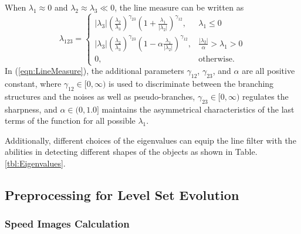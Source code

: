 When $\lambda_1 \approx 0$ and $\lambda_2 \approx \lambda_3 \ll 0$, the line measure can be written as
\begin{equation}
\label{eqn:LineMeasure}
\lambda_{123} =
\begin{cases}
\left| \lambda_3 \right| \left( \frac{\lambda_2}{\lambda_3} \right)^{\gamma_{23}} \left( 1 + \frac{\lambda_1}{\left| \lambda_2 \right|} \right)^{\gamma_{12}}, & \lambda_1 \le 0 \\
\left| \lambda_3 \right| \left( \frac{\lambda_2}{\lambda_3} \right)^{\gamma_{23}} \left( 1 - \alpha \frac{\lambda_1}{\left| \lambda_2 \right|} \right)^{\gamma_{12}}, & \frac{\left| \lambda_2 \right|}{\alpha} > \lambda_1 > 0 \\
0, & \text{otherwise}.
\end{cases}
\end{equation}
In (\ref{eqn:LineMeasure}), the additional parameters $\gamma_{12}$, $\gamma_{23}$, and $\alpha$ are all positive constant, where $\gamma_{12} \in [0, \infty)$ is used to discriminate between the branching structures and the noises as well as pseudo-branches, $\gamma_{23} \in [0, \infty)$ regulates the sharpness, and $\alpha \in (0, 1.0]$ maintains the asymmetrical characteristics of the last terms of the function for all possible $\lambda_1$.

Additionally, different choices of the eigenvalues can equip the line filter with the abilities in detecting different shapes of the objects as shown in Table. \ref{tbl:Eigenvalues}. %

\subsection{Preprocessing for Level Set Evolution}

\subsubsection{Speed Images Calculation}

